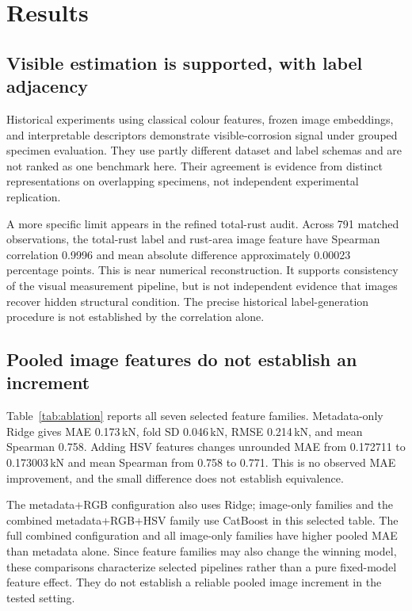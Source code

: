 \documentclass[conference]{IEEEtran}
\newcommand{\shared}{..}
\begin{document}
\section{Results}
\subsection{Visible estimation is supported, with label adjacency}
Historical experiments using classical colour features, frozen image embeddings, and interpretable descriptors demonstrate visible-corrosion signal under grouped specimen evaluation. They use partly different dataset and label schemas and are not ranked as one benchmark here. Their agreement is evidence from distinct representations on overlapping specimens, not independent experimental replication.

A more specific limit appears in the refined total-rust audit. Across 791 matched observations, the total-rust label and rust-area image feature have Spearman correlation 0.9996 and mean absolute difference approximately 0.00023 percentage points. This is near numerical reconstruction. It supports consistency of the visual measurement pipeline, but is not independent evidence that images recover hidden structural condition. The precise historical label-generation procedure is not established by the correlation alone.

\subsection{Pooled image features do not establish an increment}
Table~\ref{tab:ablation} reports all seven selected feature families. Metadata-only Ridge gives MAE 0.173\,kN, fold SD 0.046\,kN, RMSE 0.214\,kN, and mean Spearman 0.758. Adding HSV features changes unrounded MAE from 0.172711 to 0.173003\,kN and mean Spearman from 0.758 to 0.771. This is no observed MAE improvement, and the small difference does not establish equivalence.
\begin{table}[t]\centering
\caption{Pooled terminal-load results: 48 specimens, ten grouped folds. MAE and sample fold SD are in kN; $R^2$ and $\rho$ are mean fold metrics. The same folds select and score the displayed configurations.}\label{tab:ablation}
\footnotesize
\end{table}

The metadata+RGB configuration also uses Ridge; image-only families and the combined metadata+RGB+HSV family use CatBoost in this selected table. The full combined configuration and all image-only families have higher pooled MAE than metadata alone. Since feature families may also change the winning model, these comparisons characterize selected pipelines rather than a pure fixed-model feature effect. They do not establish a reliable pooled image increment in the tested setting.
\end{document}
